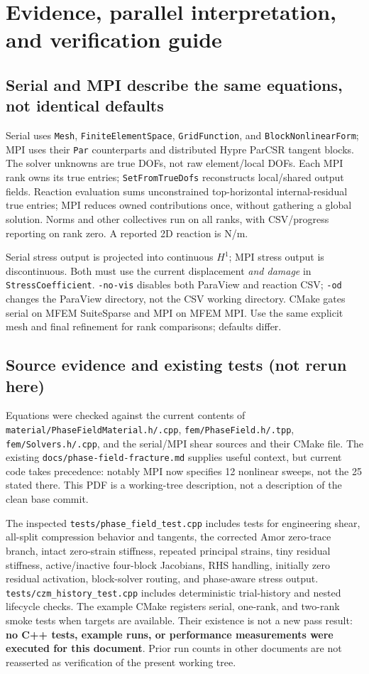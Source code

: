 \documentclass[11pt,a4paper]{article}
\newcommand{\code}[1]{\texttt{\small #1}}
\newcommand{\sectionpage}[1]{\clearpage\section{#1}}
\numberwithin{equation}{section}
\begin{document}
\sectionpage{Evidence, parallel interpretation, and verification guide}
\label{sec:evidence}
\subsection{Serial and MPI describe the same equations, not identical defaults}
Serial uses \code{Mesh}, \code{FiniteElementSpace}, \code{GridFunction}, and
\code{BlockNonlinearForm}; MPI uses their \code{Par} counterparts and
distributed Hypre ParCSR tangent blocks. The solver unknowns are true DOFs,
not raw element/local DOFs. Each MPI rank owns its true entries;
\code{SetFromTrueDofs} reconstructs local/shared output fields. Reaction
evaluation sums unconstrained top-horizontal internal-residual true entries;
MPI reduces owned contributions once, without gathering a global solution.
Norms and other collectives run on all ranks, with CSV/progress reporting on
rank zero. A reported 2D reaction is N/m.

Serial stress output is projected into continuous $H^1$; MPI stress output is
discontinuous. Both must use the current displacement \emph{and damage} in
\code{StressCoefficient}. \code{-no-vis} disables both ParaView and reaction
CSV; \code{-od} changes the ParaView directory, not the CSV working directory.
CMake gates serial on MFEM SuiteSparse and MPI on MFEM MPI. Use the same
explicit mesh and final refinement for rank comparisons; defaults differ.

\subsection{Source evidence and existing tests (not rerun here)}
Equations were checked against the current contents of
\code{material/PhaseFieldMaterial.h/.cpp}, \code{fem/PhaseField.h/.tpp},
\code{fem/Solvers.h/.cpp}, and the serial/MPI shear sources and their CMake
file. The existing \code{docs/phase-field-fracture.md} supplies useful context,
but current code takes precedence: notably MPI now specifies 12 nonlinear
sweeps, not the 25 stated there. This PDF is a working-tree description, not a
description of the clean base commit.

The inspected \code{tests/phase\_field\_test.cpp} includes tests for engineering
shear, all-split compression behavior and tangents, the corrected Amor zero-trace
branch, intact zero-strain stiffness, repeated principal strains, tiny residual
stiffness, active/inactive four-block Jacobians, RHS handling, initially zero
residual activation, block-solver routing, and phase-aware stress output.
\code{tests/czm\_history\_test.cpp} includes deterministic trial-history and
nested lifecycle checks. The example CMake registers serial, one-rank, and
two-rank smoke tests when targets are available. Their existence is not a new
pass result: \textbf{no C++ tests, example runs, or performance measurements
were executed for this document}. Prior run counts in other documents are not
reasserted as verification of the present working tree.
\end{document}
